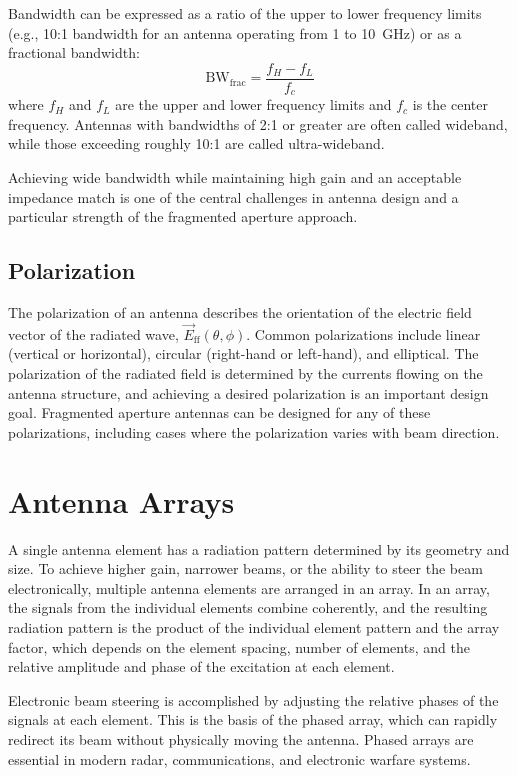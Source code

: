 Bandwidth can be expressed as a ratio of the upper to lower frequency limits (e.g., 10:1 bandwidth for an antenna operating from 1 to 10~GHz) or as a fractional bandwidth:
\begin{equation}
\text{BW}_{\text{frac}} = \frac{f_H - f_L}{f_c}
\end{equation}
where $f_H$ and $f_L$ are the upper and lower frequency limits and $f_c$ is the center frequency.  Antennas with bandwidths of 2:1 or greater are often called wideband, while those exceeding roughly 10:1 are called ultra-wideband.

Achieving wide bandwidth while maintaining high gain and an acceptable impedance match is one of the central challenges in antenna design and a particular strength of the fragmented aperture approach.

\subsection{Polarization}

The polarization of an antenna describes the orientation of the electric field vector of the radiated wave, $\vec{E}_{\text{ff}}(\theta,\phi)$.  Common polarizations include linear (vertical or horizontal), circular (right-hand or left-hand), and elliptical.  The polarization of the radiated field is determined by the currents flowing on the antenna structure, and achieving a desired polarization is an important design goal.  Fragmented aperture antennas can be designed for any of these polarizations, including cases where the polarization varies with beam direction.

\section{Antenna Arrays}

A single antenna element has a radiation pattern determined by its geometry and size.  To achieve higher gain, narrower beams, or the ability to steer the beam electronically, multiple antenna elements are arranged in an array.  In an array, the signals from the individual elements combine coherently, and the resulting radiation pattern is the product of the individual element pattern and the array factor, which depends on the element spacing, number of elements, and the relative amplitude and phase of the excitation at each element.

Electronic beam steering is accomplished by adjusting the relative phases of the signals at each element.  This is the basis of the phased array, which can rapidly redirect its beam without physically moving the antenna.  Phased arrays are essential in modern radar, communications, and electronic warfare systems.

